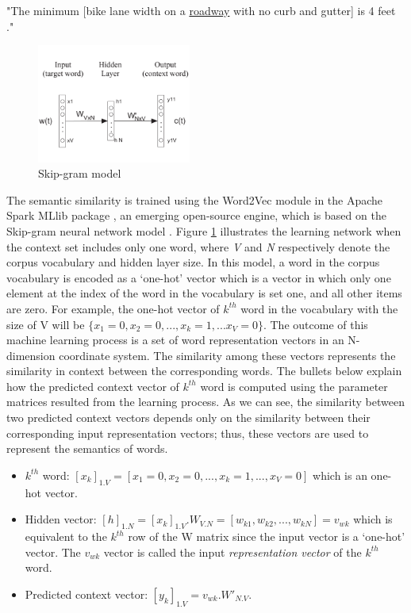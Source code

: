 \documentclass[Journal, BackFigs,NoLists, DoubleSpace]{ascelike}%
\begin{document}
%
\begin{center}
	"The minimum [bike lane width on a \underline{roadway} with no curb and gutter] is 4 feet ."
\end{center}
%
\begin{figure}[t]
	\centering
	\includegraphics[width=0.45\textwidth]{Figure4_skip-gram-model}
	\caption{Skip-gram model}
	\label{fig:skip-gram}
\end{figure}
%
The semantic similarity is trained using the Word2Vec module in the Apache Spark MLlib package \cite{apache16}, an emerging open-source engine, which is based on the Skip-gram neural network model \cite{mikolov13a}. Figure \ref{fig:skip-gram} illustrates the learning network when the context set includes only one word, where \textit{V} and \textit{N} respectively denote the corpus vocabulary and hidden layer size. In this model, a word in the corpus vocabulary is encoded as a `one-hot' vector which is a vector in which only one element at the index of the word in the vocabulary is set one, and all other items are zero. For example, the one-hot vector of $k^{th}$ word in the vocabulary with the size of V will be $\{x_1=0, x_2=0, ..., x_k=1,...x_V=0\}$. The outcome of this machine learning process is a set of word representation vectors in an N-dimension coordinate system. The similarity among these vectors represents the similarity in context between the corresponding words. The bullets below explain how the predicted context vector of $k^{th}$ word is computed using the parameter matrices resulted from the learning process. As we can see, the similarity between two predicted context vectors depends only on the similarity between their corresponding input representation vectors; thus, these vectors are used to represent the semantics of  words. 
%
\begin{itemize}
	\item $k^{th}$ word: $[x_k]_{1.V} = [x_1=0, x_2=0,...,x_k=1,..., x_V=0]$ which is an one-hot vector.
	\item Hidden vector: $[h]_{1.N} = [x_k]_{1.V}.W_{V.N} = [w_{k1},w_{k2},..., w_{kN}]= v_{wk}$ which is equivalent to the $k^{th}$ row of the W matrix since the input vector is a `one-hot' vector. The $v_{wk}$ vector is called the input \textit{representation vector} of the $k^{th}$ word.
	\item Predicted context vector: $[y_k]_{1.V} = v_{wk}.W'_{N.V}$. 
\end{itemize}
\end{document}
